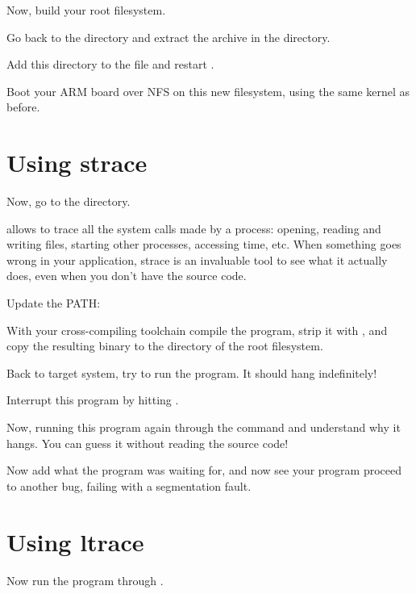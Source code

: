 Now, build your root filesystem.

Go back to the  directory
and extract the 
archive in the  directory.

Add this directory to the  file and restart
.

Boot your ARM board over NFS on this new filesystem, using the same
kernel as before.

\section{Using strace}

Now, go to the  directory.

 allows to trace all the system calls made by a process:
opening, reading and writing files, starting other processes,
accessing time, etc. When something goes wrong in your application,
strace is an invaluable tool to see what it actually does, even when
you don't have the source code.


Update the PATH:
{}
\normalsize

With your cross-compiling toolchain
compile the  program, strip it with
, and copy the resulting binary to the
 directory of the root filesystem.

Back to target system, try to run the 
program. It should hang indefinitely!

Interrupt this program by hitting \code{[Ctrl] [C]}.

Now, running this program again through the  command and
understand why it hangs. You can guess it without reading the source
code!

Now add what the program was waiting for, and now see your program
proceed to another bug, failing with a segmentation fault.

\section{Using ltrace}

Now run the program through .

